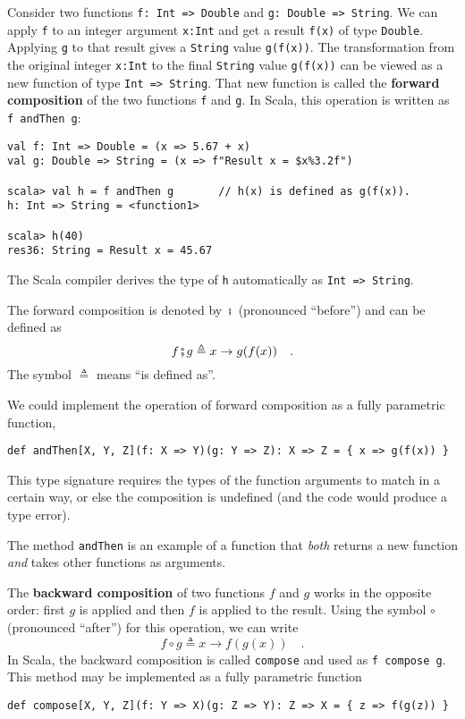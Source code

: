 Consider two functions \lstinline!f: Int => Double!
and \lstinline!g: Double => String!. We can apply \lstinline!f!
to an integer argument \lstinline!x:Int! and get a result \lstinline!f(x)!
of type \lstinline!Double!. Applying \lstinline!g! to that result
gives a \lstinline!String! value \lstinline!g(f(x))!. The transformation
from the original integer \lstinline!x:Int! to the final \lstinline!String!
value \lstinline!g(f(x))! can be viewed as a new function of type
\lstinline!Int => String!. That new function is called the \textbf{forward
composition} of the two functions \lstinline!f!
and \lstinline!g!. In Scala, this operation is written as \lstinline!f andThen g!:
\begin{lstlisting}
val f: Int => Double = (x => 5.67 + x)
val g: Double => String = (x => f"Result x = $x%3.2f")

scala> val h = f andThen g       // h(x) is defined as g(f(x)).
h: Int => String = <function1>

scala> h(40)
res36: String = Result x = 45.67
\end{lstlisting}
The Scala compiler derives the type of \lstinline!h! automatically
as \lstinline!Int => String!.

The forward composition is denoted by $\bef$ (pronounced ``before'')
and can be defined as
\begin{equation}
f\bef g\triangleq x\rightarrow g(f(x))\quad.\label{eq:def-of-forward-composition}
\end{equation}
The symbol $\triangleq$ means ``is defined as''.

We could implement the operation of forward composition as a fully
parametric function,
\begin{lstlisting}
def andThen[X, Y, Z](f: X => Y)(g: Y => Z): X => Z = { x => g(f(x)) }
\end{lstlisting}
This type signature requires the types of the function arguments to
match in a certain way, or else the composition is undefined (and
the code would produce a type error).

The method \lstinline!andThen! is an example of a function that \emph{both}
returns a new function \emph{and} takes other functions as arguments.

The \textbf{backward composition} of
two functions $f$ and $g$ works in the opposite order: first $g$
is applied and then $f$ is applied to the result. Using the symbol
$\circ$ (pronounced ``after'') for this operation, we can write
\begin{equation}
f\circ g\triangleq x\rightarrow f(g(x))\quad.\label{eq:def-of-backward-composition}
\end{equation}
In Scala, the backward composition is called \lstinline!compose!
and used as \lstinline!f compose g!. This method may be implemented
as a fully parametric function
\begin{lstlisting}
def compose[X, Y, Z](f: Y => X)(g: Z => Y): Z => X = { z => f(g(z)) }
\end{lstlisting}

